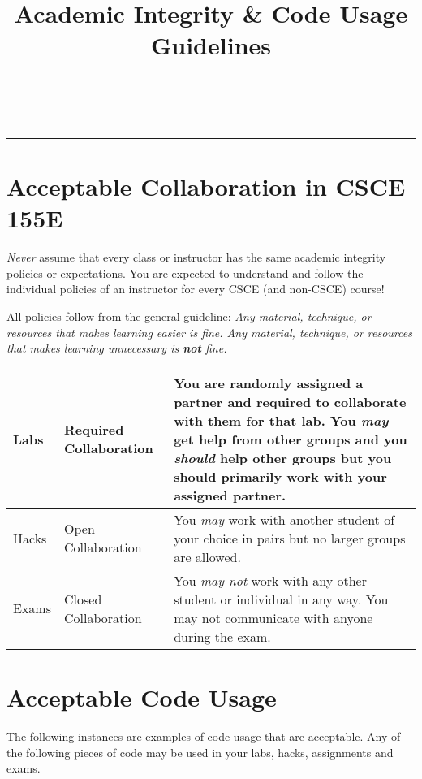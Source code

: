 \documentclass[12pt]{scrartcl}
\title{Academic Integrity \& Code Usage Guidelines}\let\Title\@title
\subtitle{Computer Science I\\
{\small
\vskip.5cm
Department of Computer Science \& Engineering \\
University of Nebraska--Lincoln}
\vskip-1cm}
\date{~}
\begin{document}
\maketitle
\vskip-1.5cm
\hrule

\section*{Acceptable Collaboration in CSCE 155E}

\emph{Never} assume that every class or instructor has the same academic 
integrity policies or expectations.  You are expected to understand and 
follow the individual policies of an instructor for every CSCE (and non-CSCE)
course!

All policies follow from the general guideline:  \emph{Any material, technique, 
or resources that makes learning easier is fine.  Any material, technique, 
or resources that makes learning unnecessary is \textbf{not} fine.}

\begin{center}
\begin{tabular}{|l|l|p{8cm}|}
\hline
Labs & Required Collaboration & You are randomly assigned a partner and required to collaborate with them for that lab.  You \emph{may} get help from other groups and
you \emph{should} help other groups but you should primarily work with your assigned partner. \\
\hline
Hacks & Open Collaboration & You \emph{may} work with another student 
of your choice in pairs but no larger groups are allowed.\\
\hline
Exams & Closed Collaboration & You \emph{may not} work with any other student or individual in any way.  You may not communicate with anyone during the exam.\\
\hline
\end{tabular}
\end{center}

\section*{Acceptable Code Usage}

The following instances are examples of code usage that are acceptable.
Any of the following pieces of code may be used in your labs, hacks, assignments
and exams.
\end{document}
